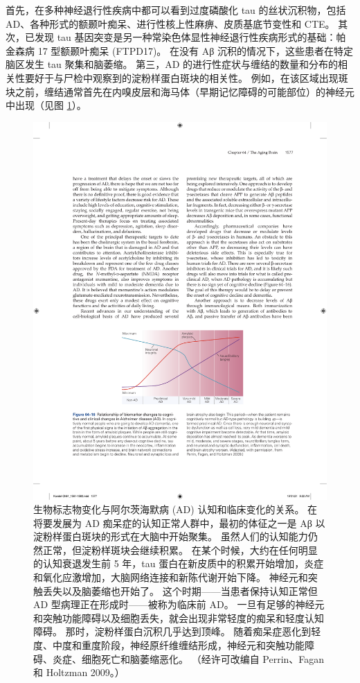 首先，在多种神经退行性疾病中都可以看到过度磷酸化 tau 的丝状沉积物，包括 AD、各种形式的额颞叶痴呆、进行性核上性麻痹、皮质基底节变性和 CTE。
其次，已发现 tau 基因突变是另一种常染色体显性神经退行性疾病形式的基础：帕金森病 17 型额颞叶痴呆 (FTPD17)。
在没有 Aβ 沉积的情况下，这些患者在特定脑区发生 tau 聚集和脑萎缩。
第三，AD 的进行性症状与缠结的数量和分布的相关性要好于与尸检中观察到的淀粉样蛋白斑块的相关性。
例如，在该区域出现斑块之前，缠结通常首先在内嗅皮层和海马体（早期记忆障碍的可能部位）的神经元中出现（见图 \ref{fig:64_16}）。


\begin{figure}[htbp]
	\centering
	\includegraphics[width=0.7\linewidth]{chap64/fig_64_16}
	\caption{生物标志物变化与阿尔茨海默病 (AD) 认知和临床变化的关系。 在将要发展为 AD 痴呆症的认知正常人群中，最初的体征之一是 Aβ 以淀粉样蛋白斑块的形式在大脑中开始聚集。 虽然人们的认知能力仍然正常，但淀粉样斑块会继续积累。 在某个时候，大约在任何明显的认知衰退发生前 5 年，tau 蛋白在新皮质中的积累开始增加，炎症和氧化应激增加，大脑网络连接和新陈代谢开始下降。 神经元和突触丢失以及脑萎缩也开始了。 这个时期——当患者保持认知正常但 AD 型病理正在形成时——被称为临床前 AD。 一旦有足够的神经元和突触功能障碍以及细胞丢失，就会出现非常轻度的痴呆和轻度认知障碍。 那时，淀粉样蛋白沉积几乎达到顶峰。 随着痴呆症恶化到轻度、中度和重度阶段，神经原纤维缠结形成，神经元和突触功能障碍、炎症、细胞死亡和脑萎缩恶化。 （经许可改编自 Perrin、Fagan 和 Holtzman 2009。）}
	\label{fig:64_16}
\end{figure}


